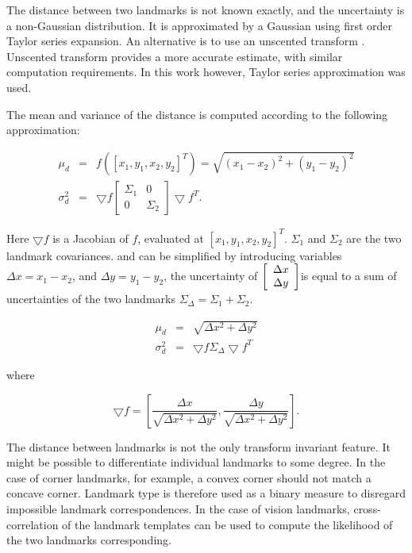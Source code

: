 The distance between two landmarks is not known exactly, and the
uncertainty is a non-Gaussian distribution. It is approximated by a
Gaussian using first order Taylor series expansion. An alternative is to
use an unscented transform \cite{unscented}. Unscented transform
provides a more accurate estimate, with similar computation
requirements. In this work however, Taylor series approximation was
used.

The mean and variance of the distance is computed according to the
following approximation:

\begin{eqnarray}
  \mu_d  &=& f([x_1,y_1,x_2,y_2]^T) = \sqrt{(x_1-x_2)^2 + (y_1-y_2)^2}
\label{eqn:dist_estimate_mu}\\
 \sigma_{d}^2 &=& \bigtriangledown f \left [\begin {array}{cc} \Sigma_1 & 0\\
 0& \Sigma_2 \end{array}\right ] \bigtriangledown f^T.
\label{eqn:dist_estimate_cov}
\end{eqnarray}

Here $\bigtriangledown f$ is a Jacobian of $f$, evaluated at
$[x_1,y_1,x_2,y_2]^T$. $\Sigma_1$ and $\Sigma_2$ are the two landmark
covariances.  and
 can be simplified by introducing
variables $\Delta x = x_1 - x_2$, and $\Delta y = y_1 - y_2$, the
uncertainty of $\left[\begin{array}{c} \Delta x\\ \Delta y \end{array} \right]$is equal to a sum of
uncertainties of the two landmarks $\Sigma_\Delta = \Sigma_1 +
\Sigma_2$.

\begin{eqnarray}
\mu_d &=& \sqrt{\Delta x^2 +\Delta y^2}\\
\sigma_d^2 &=& \bigtriangledown f \Sigma_\Delta \bigtriangledown f^T
\end{eqnarray}

where

$$ 
\bigtriangledown f = \left[
\frac{\Delta x}{\sqrt{\Delta x^2 + \Delta y^2}}, 
\frac{\Delta y}{\sqrt{\Delta x^2 + \Delta y^2}}
\right].
$$


The distance between landmarks is not the only transform invariant
feature. It might be possible to differentiate individual landmarks to
some degree. In the case of corner landmarks, for example, a convex
corner should not match a concave corner. Landmark type is therefore
used as a binary measure to disregard impossible landmark
correspondences. In the case of vision landmarks, cross-correlation of
the landmark templates can be used to compute the likelihood of the
two landmarks corresponding.

